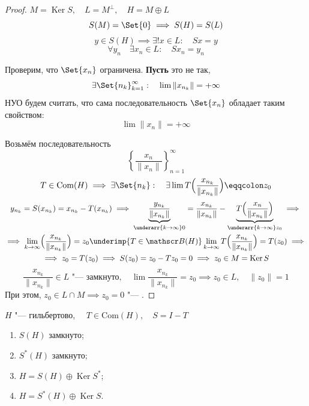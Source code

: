 \begin{proof}
	$ M = \operatorname{Ker} S, \quad L = M^\perp, \quad H = M \oplus L $
	$$ S(M) = \Set{0} \implies S(H) = S(L) $$
	$$ y \in S(H) \implies \exists! x \in L : \quad Sx = y $$
	$$ \forall y_n \quad \exists x_n \in L : \quad Sx_n = y_n $$

	Проверим, что $ \Set{x_n} $ ограничена.
	\textbf{Пусть} это не так, \ie
	$$ \exists \Set{n_k}_{k = 1}^\infty : \quad \lim\|x_{n_k}\| = +\infty $$
	НУО будем считать, что сама последовательность $ \Set{x_n} $ обладает таким свойством:
	$$ \lim\|x_n\| = +\infty $$

	Возьмём последовательность
	$$ \left\{\frac{x_n}{\|x_n\|}\right\}_{n = 1}^\infty $$
	$$ T \in \mathrm{Com}(H) \implies \exists \Set{n_k} : \quad \exists
	\lim T \Bigl( \frac{x_{n_k}}{\|x_{n_k}\|} \Bigr) \eqqcolon z_0 $$
	\begin{multline*}
		y_{n_k} = S(x_{n_k}) = x_{n_k} - T(x_{n_k}) \implies
		\underbrace{\frac{y_{n_k}}{\|x_{n_k}\|}}_{\underarr{k \to \infty} 0} =
		\frac{x_{n_k}}{\|x_{n_k}\|} -
		\underbrace{T \Bigl( \frac{x_n}{\|x_{n_k}\|} \Bigr)}_{\underarr{k \to \infty} z_0}
		\implies \\
		\implies \lim\limits_{k \to \infty} \Bigl( \frac{x_{n_k}}{\|x_{n_k}\|} \Bigr) =
		z_0 \underimp{T \in \mathscr B(H)} \lim\limits_{k \to \infty} T
		\Bigl( \frac{x_{n_k}}{\|x_{n_k}\|} \Bigr) = T(z_0) \implies \\
		\implies z_0 = T(z_0) \implies S(z_0) = z_0 - Tz_0 = 0 \implies z_0 \in M =
		\operatorname{Ker} S
	\end{multline*}
	$$ \frac{x_{n_k}}{\|x_{n_k}\|} \in L \text{ "--- замкнуто}, \quad
	\lim \frac{x_{n_k}}{\|x_{n_k}\|} = z_0 \implies z_0 \in L, \quad \|z_0\| = 1 $$
	При этом, $ z_0 \in L \cap M \implies z_0 = 0 $ "--- \contra.
\end{proof}

\begin{theorem}
	$ H $ "--- гильбертово, $ \quad T \in \mathrm{Com}(H), \quad S = I - T $

	\begin{enumerate}
		\item $ S(H) $ замкнуто;
		\item $ S^*(H) $ замкнуто;
		\item $ H = S(H) \oplus \operatorname{Ker} S^* $;
		\item $ H = S^*(H) \oplus \operatorname{Ker}S $.
	\end{enumerate}
\end{theorem}

